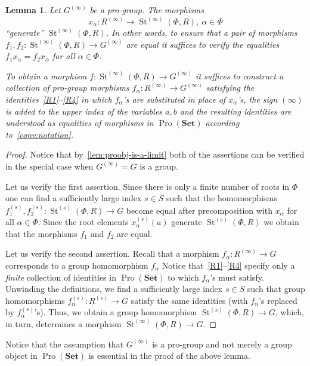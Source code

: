 \documentclass{article}
\numberwithin{equation}{section}
\newtheorem{lemma}{Lemma} \numberwithin{lemma}{section}
\theoremstyle{definition}
\theoremstyle{remark}
\DeclareMathOperator\St{St}
\DeclareMathOperator{\Pro}{Pro}
\newcommand{\Set}{\mathbf{Set}}
\begin{document}
\begin{lemma}\label{SteinbergPresentation}
Let \(G^{(\infty)}\) be a pro-group. The morphisms \[x_{\alpha} \colon R^{(\infty)} \to \St^{(\infty)}(\Phi, R), \ \alpha\in \Phi\] ``generate'' $\St^{(\infty)}(\Phi, R)$. In other words, to ensure that a pair of morphisms $f_1,f_2\colon\St^{(\infty)}(\Phi, R) \to G^{(\infty)}$ are equal it suffices to verify the equalities $f_1 x_{\alpha} = f_2 x_\alpha$ for all $\alpha\in\Phi$.

To obtain a morphism $f \colon \St^{(\infty)}(\Phi, R) \to G^{(\infty)}$ it suffices to construct a collection of pro-group morphisms \(f_{\alpha} \colon R^{(\infty)} \to G^{(\infty)}\) satisfying the identities~\eqref{R1}--\eqref{R4} in which $f_{\alpha}$'s are substituted in place of $x_\alpha$'s, the sign $(\infty)$ is added to the upper index of the variables $a, b$ and the resulting identities are understood as equalities of morphisms in \(\Pro(\Set)\) according to~\cref{conv:notation}.
\end{lemma}
\begin{proof}
Notice that by~\cref{lem:proobj-is-a-limit} both of the assertions can be verified in the special case when $G^{(\infty)} = G$ is a group.

Let us verify the first assertion. Since there is only a finite number of roots in $\Phi$ one can find a sufficiently large index $s \in S$ such that the homomorphisms $f_1^{(s)}, f_2^{(s)}\colon \St^{(s)}(\Phi, R) \to G$ become equal after precomposition with $x_\alpha$ for all $\alpha \in \Phi$.
Since the root elements $x_\alpha^{(s)}(a)$ generate $\St^{(s)}(\Phi, R)$ we obtain that the morphisms $f_1$ and $f_2$ are equal.

Let us verify the second assertion. Recall that a morphism $f_\alpha \colon R^{(\infty)} \to G$ corresponds to a group homomorphism $f_\alpha$
Notice that~\eqref{R1}--\eqref{R4} specify only a {\it finite} collection of identities in $\Pro(\Set)$ to which $f_\alpha$'s must satisfy.
Unwinding the definitions, we find a sufficiently large index $s \in S$ such that group homomorphisms 
 $f_\alpha^{(s)}\colon R^{(s)} \to G$ satisfy the same identities (with $f_\alpha$'s replaced by $f_\alpha^{(s)}$'s).
Thus, we obtain a group homomorphism $\St^{(s)}(\Phi, R) \to G$, which, in turn, determines a morphism $\St^{(\infty)}(\Phi, R) \to G$.
\end{proof}
Notice that the assumption that $G^{(\infty)}$ is a pro-group and not merely a group object in $\Pro(\Set)$ is essential in the proof of the above lemma.
\end{document}
